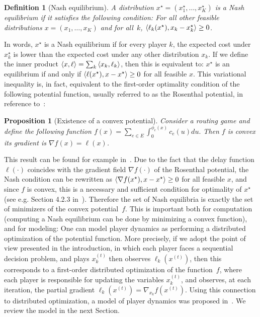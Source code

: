 \documentclass{sig-alternate-ipsn13}
\newtheorem{definition}{Definition}
\newtheorem{proposition}{Proposition}
\begin{document}
\begin{definition}[Nash equilibrium]
A distribution $x^\star = (x_1^\star, \dots, x_K^\star)$ is a Nash equilibrium if it satisfies the following condition: For all other feasible  distributions $x = (x_1, \dots, x_K)$ and for all~$k$, $\left\langle \ell_k(x^\star), x_k - x_k^\star \right\rangle \geq 0$.
\end{definition}
In words, $x^\star$ is a Nash equilibrium if for every player $k$, the expected cost under $x_k^\star$ is lower than the expected cost under any other distribution $x_k$. If we define the inner product $\left\langle x, \ell \right\rangle = \sum_{k} \left\langle x_k, \ell_k \right\rangle$, then this is equivalent to: $x^\star$ is an equilibrium if and only if $\left\langle \ell(x^\star), x - x^\star \right\rangle \geq 0$ for all feasible $x$. This variational inequality is, in fact, equivalent to the first-order optimality condition of the following potential function, usually referred to as the Rosenthal potential, in reference to~\cite{rosenthal1973class}:
\begin{proposition}[Existence of a convex potential]
\label{prop:potential}
Consider a routing game and define the following function
$
f(x) = \sum_{e \in E} \int_0^{\phi_e(x)} c_e(u)du.
$
Then $f$ is convex its gradient is $\nabla f(x) = \ell(x)$.
\end{proposition}
This result can be found for example in~\cite{roughgarden2007}. Due to the fact that the delay function $\ell(\cdot)$ coincides with the gradient field $\nabla f(\cdot)$ of the Rosenthal potential, the Nash condition can be rewritten as
$\left\langle \nabla f(x^\star), x - x^\star \right\rangle \geq 0$ for all feasible $x$,
and since $f$ is convex, this is a necessary and sufficient condition for optimality of $x^\star$ (see e.g. Section 4.2.3 in~\cite{boyd2010convex}). Therefore the set of Nash equilibria is exactly the set of minimizers of the convex potential~$f$. This is important both for computation (computing a Nash equilibrium can be done by minimizing a convex function), and for modeling: One can model player dynamics as performing a distributed optimization of the potential function. More precisely, if we adopt the point of view presented in the introduction, in which each player faces a sequential decision problem, and plays $x^{(t)}_k$ then observes $\ell_k(x^{(t)})$, then this corresponds to a first-order distributed optimization of the function~$f$, where each player is responsible for updating the variables $x_k^{(t)}$, and observes, at each iteration, the partial gradient $\ell_k(x^{(t)}) = \nabla_{x_k} f(x^{(t)})$. Using this connection to distributed optimization, a model of player dynamics was proposed in~\cite{krichene2015MD}. We review the model in the next Section.
\end{document}
